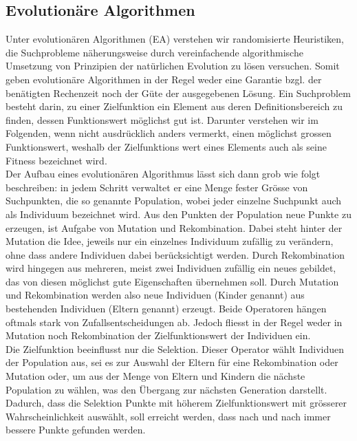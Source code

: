 \subsection{Evolutionäre Algorithmen}
Unter evolutionären Algorithmen (EA) verstehen wir randomisierte Heuristiken, die Suchprobleme näherungsweise durch vereinfachende algorithmische Umsetzung von
Prinzipien der natürlichen Evolution zu lösen versuchen. Somit geben evolutionäre Algorithmen in der Regel weder eine Garantie bzgl. der benätigten Rechenzeit noch der Güte der ausgegebenen Lösung. Ein Suchproblem besteht darin, zu einer Zielfunktion ein Element aus deren Definitionsbereich zu finden, dessen Funktionswert möglichst gut ist. Darunter verstehen wir im Folgenden, wenn nicht ausdrücklich anders vermerkt, einen möglichst grossen Funktionswert, weshalb der Zielfunktions wert eines Elements auch als seine Fitness bezeichnet wird.\\

Der Aufbau eines evolutionären Algorithmus lässt sich dann grob wie folgt beschreiben: in jedem Schritt verwaltet er eine Menge fester Grösse von Suchpunkten, die so genannte Population, wobei jeder einzelne Suchpunkt auch als Individuum bezeichnet wird. Aus den Punkten der Population neue Punkte zu erzeugen, ist Aufgabe von Mutation und Rekombination. Dabei steht hinter der Mutation die Idee, jeweils nur ein einzelnes Individuum zufällig zu verändern, ohne dass andere Individuen dabei berücksichtigt werden. Durch Rekombination wird hingegen aus mehreren, meist zwei Individuen zufällig ein neues gebildet, das von diesen möglichst gute Eigenschaften übernehmen soll. Durch Mutation und Rekombination werden also neue Individuen (Kinder genannt) aus bestehenden Individuen (Eltern genannt) erzeugt. Beide Operatoren hängen oftmals stark von Zufallsentscheidungen ab. Jedoch fliesst in der Regel weder in Mutation noch Rekombination der Zielfunktionswert der Individuen ein.\\

Die Zielfunktion beeinflusst nur die Selektion. Dieser Operator wählt Individuen der Population aus, sei es zur Auswahl der Eltern für eine Rekombination oder Mutation oder, um aus der Menge von Eltern und Kindern die nächste Population zu wählen, was den Übergang zur nächsten Generation darstellt. Dadurch, dass die Selektion Punkte mit höherem Zielfunktionswert mit grösserer Wahrscheinlichkeit auswählt, soll erreicht werden, dass nach und nach immer bessere Punkte gefunden werden. \cite{droste}

